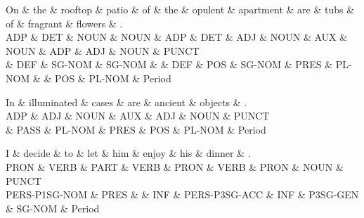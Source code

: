 \begin{dependency}
\begin{deptext}
On \& the \& rooftop \& patio \& of \& the \& opulent \& apartment \& are \& tubs \& of \& fragrant \& flowers \& . \\
ADP \& DET \& NOUN \& NOUN \& ADP \& DET \& ADJ \& NOUN \& AUX \& NOUN \& ADP \& ADJ \& NOUN \& PUNCT \\
 \& DEF \& SG-NOM \& SG-NOM \&  \& DEF \& POS \& SG-NOM \& PRES \& PL-NOM \&  \& POS \& PL-NOM \& Period \\
\end{deptext}



\end{dependency}

\begin{dependency}
\begin{deptext}
In \& illuminated \& cases \& are \& ancient \& objects \& . \\
ADP \& ADJ \& NOUN \& AUX \& ADJ \& NOUN \& PUNCT \\
 \& PASS \& PL-NOM \& PRES \& POS \& PL-NOM \& Period \\
\end{deptext}



\end{dependency}

\begin{dependency}
\begin{deptext}
I \& decide \& to \& let \& him \& enjoy \& his \& dinner \& . \\
PRON \& VERB \& PART \& VERB \& PRON \& VERB \& PRON \& NOUN \& PUNCT \\
PERS-P1SG-NOM \& PRES \&  \& INF \& PERS-P3SG-ACC \& INF \& P3SG-GEN \& SG-NOM \& Period \\
\end{deptext}



\end{dependency}

